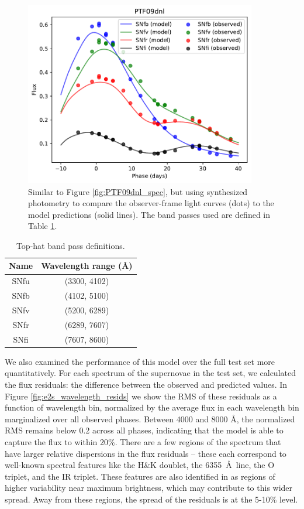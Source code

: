 \begin{figure}
    \centering
    \includegraphics[width=0.9\textwidth]{figures/nn_twins/PTF09dnl_lc.pdf}
    \caption{Similar to Figure \ref{fig:PTF09dnl_spec}, but using synthesized photometry to compare the observer-frame light curves (dots) to the model predictions (solid lines). The band passes used are defined in Table \ref{tab:snf_tophats}.}
    \label{fig:PTF09dnl_lc}
\end{figure}

\begin{table}[htpb]
    \centering
    \begin{tabular}{cc}\toprule
        Name & Wavelength range (\AA) \\\midrule
        SNfu & (3300, 4102)\\
        SNfb & (4102, 5100)\\
        SNfv & (5200, 6289)\\
        SNfr & (6289, 7607)\\
        SNfi & (7607, 8600)\\\bottomrule
    \end{tabular}
    \caption{Top-hat band pass definitions.}
    \label{tab:snf_tophats}
\end{table}

We also examined the performance of this model over the full test set more quantitatively. For each spectrum of the supernovae in the test set, we calculated the flux residuals: the difference between the observed and predicted values. In Figure \ref{fig:e2s_wavelength_resids} we show the RMS of these residuals as a function of wavelength bin, normalized by the average flux in each wavelength bin marginalized over all observed phases. Between 4000 and 8000 \AA, the normalized RMS remains below 0.2 across all phases, indicating that the model is able to capture the flux to within 20\%. There are a few regions of the spectrum that have larger relative dispersions in the flux residuals -- these each correspond to well-known spectral features like the  H\&K doublet, the  6355~\AA\ line, the O triplet, and the  IR triplet. These features are also identified in  as regions of higher variability near maximum brightness, which may contribute to this wider spread. Away from these regions, the spread of the residuals is at the 5-10\% level.

